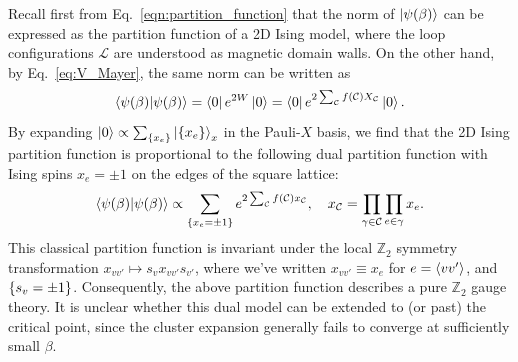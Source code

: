 \documentclass[aps,prl,twocolumn,floatfix,nofootinbib]{revtex4-2}
\theoremstyle{definition}
\begin{document}
Recall first from Eq.~\eqref{eqn:partition_function} that the norm of $\ket{\psi(\beta)}$ can be expressed as the partition function of a 2D Ising model, where the loop configurations $\mathcal{L}$ are understood as magnetic domain walls. On the other hand, by Eq.~\eqref{eq:V_Mayer}, the same norm can be written as
\begin{equation}
    \bra{\psi(\beta)} \ket{\psi(\beta)} = \bra{0} e^{2W} \ket{0} = \bra{0} e^{2 \sum_{\mathcal{C}} f(\mathcal{C}) X_{\mathcal{C}}} \ket{0} .
\end{equation}
By expanding $\ket{0} \propto \sum_{\qty{x_{e}}} \ket{\qty{x_{e}}}_x$ in the Pauli-$X$ basis, we find that the 2D Ising partition function is proportional to the following dual partition function with Ising spins $x_{e} = \pm 1$ on the edges of the square lattice:
\begin{equation}
    \bra{\psi(\beta)} \ket{\psi(\beta)} \propto \sum_{\qty{x_{e} = \pm 1}} e^{2 \sum_{\mathcal{C}} f(\mathcal{C}) x_{\mathcal{C}}}, \quad x_{\mathcal{C}} = \prod_{\gamma \in \mathcal{C}} \prod_{e \in \gamma} x_{e} .
\end{equation}
This classical partition function is invariant under the local $\mathbb{Z}_{2}$ symmetry transformation $x_{v v'} \mapsto s_{v} x_{v v'} s_{v'}$, where we've written $x_{v v'} \equiv x_{e}$ for $e = \expval{v v'}$, and $\qty{s_{v} = \pm 1}$. Consequently, the above partition function describes a pure $\mathbb{Z}_{2}$ gauge theory.  It is unclear whether this dual model can be extended to (or past) the critical point, since the cluster expansion generally fails to converge at sufficiently small $\beta$.

\makeatletter
\let\addcontentsline\old@addcontentsline
\makeatother

\end{document}
